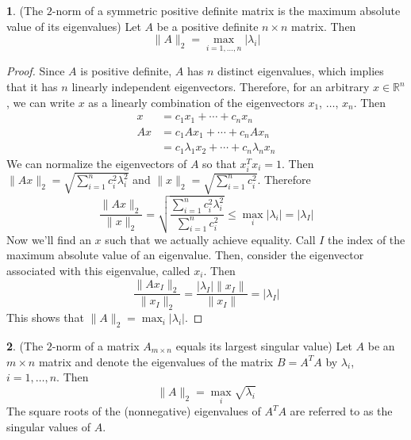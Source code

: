 \documentclass[12pt]{article}
\theoremstyle{definition}
\newcommand{\R}{\mathbb{R}}
\newcommand{\norm}[1]{\lVert#1\rVert}
\newtheorem{theorem}{\color{ForestGreen}{\textbf{Theorem}}}
\theoremstyle{definition}
\begin{document}
\begin{theorem}(The $2$-norm of a symmetric positive definite matrix is the maximum absolute value of its eigenvalues)
Let $A$ be a positive definite $n \times n$ matrix. Then 
\begin{equation}
	\norm{A}_2 = \max_{i=1,\ldots, n} |\lambda_i|
\end{equation}
\end{theorem}
\begin{proof}
Since $A$ is positive definite, $A$ has $n$ distinct eigenvalues, which implies that it has $n$ linearly independent eigenvectors. Therefore, for an arbitrary $x \in \R^n$, we can write $x$ as a linearly combination of the eigenvectors $x_1$, $\ldots$, $x_n$. Then
\begin{align*}
	x &= c_1 x_1 + \cdots + c_n x_n \\
	A x &= c_1 A x_1 + \cdots + c_n A x_n \\
	&= c_1 \lambda_1 x_2 + \cdots + c_n \lambda_n x_n 
\end{align*}
We can normalize the eigenvectors of $A$ so that $x_i^T x_i = 1$. Then $\norm{Ax}_2 = \sqrt{\sum_{i=1}^n c_i^2 \lambda_i^2}$ and $\norm{x}_2 = \sqrt{\sum_{i=1}^n c_i^2}$. Therefore 
\begin{equation}
	\frac{\norm{Ax}_2}{\norm{x}_2} = \sqrt{\frac{\sum_{i=1}^n c_i^2 \lambda_i^2}{\sum_{i=1}^n c_i^2}} \leq \max_i |\lambda_i| = |\lambda_I|
\end{equation}
Now we'll find an $x$ such that we actually achieve equality. Call $I$ the index of the maximum absolute value of an eigenvalue. Then, consider the eigenvector associated with this eigenvalue, called $x_i$. Then
\begin{equation}
	\frac{\norm{Ax_I}_2}{\norm{x_I}_2} = \frac{|\lambda_I|\norm{x_I}}{\norm{x_I}} = |\lambda_I|
\end{equation}
This shows that $\norm{A}_2 =  \max_i |\lambda_i|$.
\end{proof}

\begin{theorem}(The $2$-norm of a matrix $A_{m \times n}$ equals its largest singular value)
Let $A$ be an $m \times n$ matrix and denote the eigenvalues of the matrix $B = A^TA$ by $\lambda_i$, $i=1,\ldots, n$. Then 
\begin{equation}
	\norm{A}_2 = \max_i \sqrt{\lambda_i}
\end{equation}
The square roots of the (nonnegative) eigenvalues of $A^TA$ are referred to as the singular values of $A$.
\end{theorem}
\end{document}
